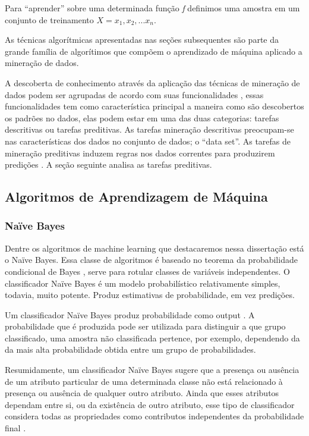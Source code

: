 Para ``aprender'' sobre uma determinada função \textit{f} definimos uma amostra em um conjunto de treinamento $X = {x_{1}, x_{2}, ...x_{n}}$.

As técnicas algorítmicas apresentadas nas seções subsequentes são parte da grande família de algorítimos que compõem 
o aprendizado de máquina aplicado a mineração de dados.

A descoberta de conhecimento através da aplicação das técnicas de mineração de dados podem ser agrupadas de acordo com suas funcionalidades \cite{DataMining2}, 
essas funcionalidades tem como característica principal a maneira como são descobertos os padrões no dados, elas podem estar 
em uma das duas categorias: tarefas descritivas ou tarefas preditivas. As tarefas mineração descritivas preocupam-se nas características 
dos dados no conjunto de dados; o ``data set''. As tarefas de mineração preditivas induzem regras nos dados correntes para produzirem 
predições \cite{DataMining2}. A seção seguinte analisa as tarefas preditivas.



\subsection{Algoritmos de Aprendizagem de Máquina}

\subsubsection{Naïve Bayes}

Dentre os algoritmos de machine learning que destacaremos nessa dissertação está o Naïve Bayes. 
Essa classe de algoritmos é baseado no teorema da probabilidade condicional de Bayes \cite{montgomery2000estatistica}, serve 
para rotular classes de variáveis independentes. O classificador Naïve Bayes é um modelo probabilístico relativamente simples, todavia, muito potente. Produz estimativas de probabilidade, em vez predições.

Um classificador Naïve Bayes produz probabilidade como output \cite{policarpo2015semantic}. A probabilidade que é produzida pode ser utilizada para distinguir a que grupo classificado, uma amostra não classificada pertence, por exemplo, dependendo da da mais alta probabilidade obtida entre um grupo de probabilidades.

Resumidamente, um classificador Naïve Bayes sugere que a presença ou ausência de um atributo particular de uma determinada classe não está relacionado à presença ou ausência de qualquer outro atributo. Ainda que esses atributos dependam entre si, ou da existência de outro atributo, esse tipo de classificador considera todas as propriedades como contributos independentes da probabilidade final \cite{policarpo2015semantic}.

